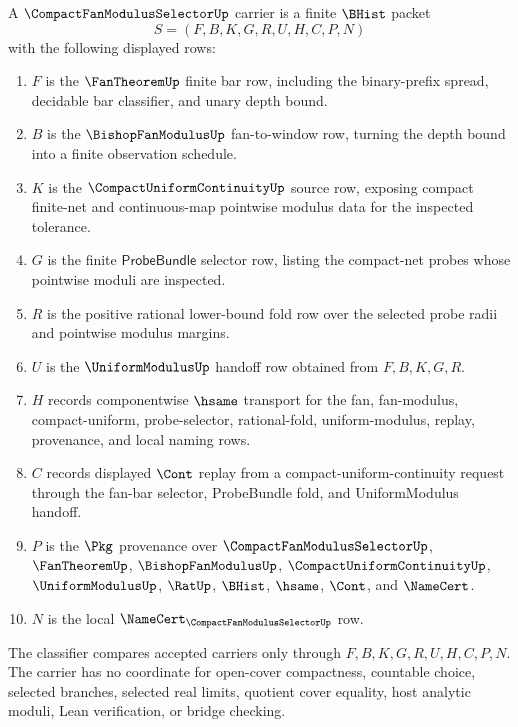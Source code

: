\begin{definition}
\label{def:compact-fan-modulus-selector-carrier}
A $\CompactFanModulusSelectorUp$ carrier is a finite $\BHist$ packet
$$
S=(F,B,K,G,R,U,H,C,P,N)
$$
with the following displayed rows:
\begin{enumerate}
\item $F$ is the $\FanTheoremUp$ finite bar row, including the binary-prefix spread, decidable bar classifier, and unary depth bound.
\item $B$ is the $\BishopFanModulusUp$ fan-to-window row, turning the depth bound into a finite observation schedule.
\item $K$ is the $\CompactUniformContinuityUp$ source row, exposing compact finite-net and continuous-map pointwise modulus data for the inspected tolerance.
\item $G$ is the finite $\mathsf{ProbeBundle}$ selector row, listing the compact-net probes whose pointwise moduli are inspected.
\item $R$ is the positive rational lower-bound fold row over the selected probe radii and pointwise modulus margins.
\item $U$ is the $\UniformModulusUp$ handoff row obtained from $F,B,K,G,R$.
\item $H$ records componentwise $\hsame$ transport for the fan, fan-modulus, compact-uniform, probe-selector, rational-fold, uniform-modulus, replay, provenance, and local naming rows.
\item $C$ records displayed $\Cont$ replay from a compact-uniform-continuity request through the fan-bar selector, ProbeBundle fold, and UniformModulus handoff.
\item $P$ is the $\Pkg$ provenance over $\CompactFanModulusSelectorUp$, $\FanTheoremUp$, $\BishopFanModulusUp$, $\CompactUniformContinuityUp$, $\UniformModulusUp$, $\RatUp$, $\BHist$, $\hsame$, $\Cont$, and $\NameCert$.
\item $N$ is the local $\NameCert_{\CompactFanModulusSelectorUp}$ row.
\end{enumerate}
The classifier compares accepted carriers only through $F,B,K,G,R,U,H,C,P,N$. The carrier has no coordinate for open-cover compactness, countable choice, selected branches, selected real limits, quotient cover equality, host analytic moduli, Lean verification, or bridge checking.
\end{definition}

